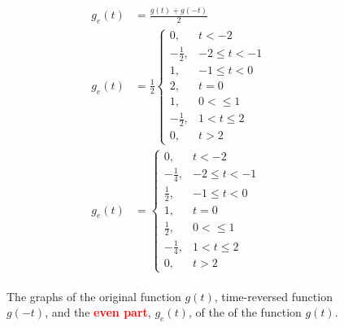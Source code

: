 \documentclass[a4paper, 12pt]{article}
\begin{document}
\begin{itemize}
\begin{itemize}
\begin{itemize}
\begin{equation}
\begin{gathered}
\begin{alignedat}{1}
g_{e}(t) &= \frac{g(t) + g(-t)}{2} \\
g_{e}(t) &= \frac{1}{2}
\begin{cases}
0, & t < -2 \\
-\frac{1}{2}, & -2 \leq t < -1 \\
1, & -1 \leq t < 0 \\
2, & t = 0 \\
1, & 0 < \leq 1 \\
-\frac{1}{2}, & 1 < t \leq 2 \\
0, & t > 2
\end{cases} \\
g_{e}(t) &=
\begin{cases}
0, & t < -2 \\
-\frac{1}{4}, & -2 \leq t < -1 \\
\frac{1}{2}, & -1 \leq t < 0 \\
1, & t = 0 \\
\frac{1}{2}, & 0 < \leq 1 \\
-\frac{1}{4}, & 1 < t \leq 2 \\
0, & t > 2 
\end{cases}
\end{alignedat}
\end{gathered}
\end{equation}
\begin{figure}[h!]
\caption{The graphs of the original function $g(t)$, time-reversed function $g(-t)$, and the \textcolor{red}{\textbf{even part}}, $g_{e}(t)$, of the of the function $g(t)$.}

\end{figure}
\end{itemize}
\end{itemize}
\end{itemize}
\end{document}
